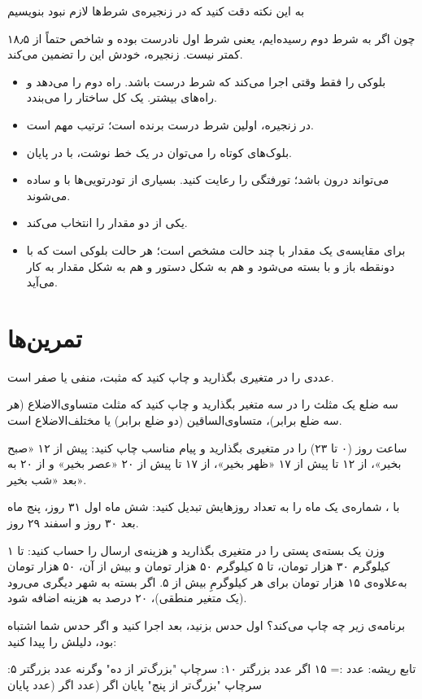 به این نکته دقت کنید که در زنجیره‌ی شرط‌ها لازم نبود بنویسیم
\begin{center}\end{center}
چون اگر به شرط دوم رسیده‌ایم، یعنی شرط اول نادرست بوده و شاخص حتماً از
۱۸٫۵ کمتر نیست. زنجیره، خودش این را تضمین می‌کند.

\begin{summary}
\begin{itemize}
  \item {} بلوکی را فقط وقتی اجرا می‌کند که شرط درست باشد.
         راه دوم را می‌دهد و  راه‌های
        بیشتر. یک  کل ساختار را می‌بندد.
  \item در زنجیره، اولین شرط درست برنده است؛ ترتیب مهم است.
  \item بلوک‌های کوتاه را می‌توان در یک خط نوشت، با  در پایان.
  \item {} می‌تواند درون  باشد؛ تورفتگی را رعایت کنید.
        بسیاری از تودرتویی‌ها با  و  ساده می‌شوند.
  \item {} یکی از دو مقدار را انتخاب می‌کند.
  \item {} برای مقایسه‌ی یک مقدار با چند حالت مشخص است؛ هر
        حالت بلوکی است که با دونقطه باز و با  بسته می‌شود و
        هم به شکل دستور و هم به شکل مقدار به کار می‌آید.
\end{itemize}
\end{summary}

\section*{تمرین‌ها}

\exercise عددی را در متغیری بگذارید و چاپ کنید که مثبت، منفی یا صفر است.

\exercise سه ضلع یک مثلث را در سه متغیر بگذارید و چاپ کنید که مثلث
متساوی‌الاضلاع (هر سه ضلع برابر)، متساوی‌الساقین (دو ضلع برابر) یا مختلف‌الاضلاع
است.

\exercise ساعت روز (۰ تا ۲۳) را در متغیری بگذارید و پیام مناسب چاپ کنید:
پیش از ۱۲ «صبح بخیر»، از ۱۲ تا پیش از ۱۷ «ظهر بخیر»، از ۱۷ تا پیش از ۲۰
«عصر بخیر» و از ۲۰ به بعد «شب بخیر».

\exercise با ، شماره‌ی یک ماه را به تعداد روزهایش تبدیل کنید:
شش ماه اول ۳۱ روز، پنج ماه بعد ۳۰ روز و اسفند ۲۹ روز.

\exercise وزن یک بسته‌ی پستی را در متغیری بگذارید و هزینه‌ی ارسال را حساب
کنید: تا ۱ کیلوگرم ۳۰ هزار تومان، تا ۵ کیلوگرم ۵۰ هزار تومان و بیش از آن،
۵۰ هزار تومان به‌علاوه‌ی ۱۵ هزار تومان برای هر کیلوگرمِ بیش از ۵. اگر بسته به شهر دیگری می‌رود (یک متغیر
منطقی)، ۲۰ درصد به هزینه اضافه شود.

\exercise برنامه‌ی زیر چه چاپ می‌کند؟ اول حدس بزنید، بعد اجرا کنید و اگر
حدس شما اشتباه بود، دلیلش را پیدا کنید:
\begin{salamfa}
تابع ریشه:
    عدد := ۱۵
    اگر عدد بزرگتر ۱۰:
        سرچاپ "بزرگ‌تر از ده"
    وگرنه عدد بزرگتر ۵:
        سرچاپ "بزرگ‌تر از پنج"
    پایان
    اگر (عدد %
    اگر (عدد %
پایان
\end{salamfa}

